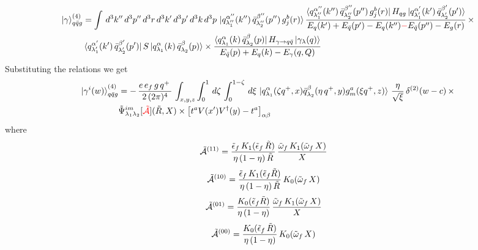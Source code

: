 \documentclass[9pt]{article}
\newcommand{\chg}[1]{{\color{red}#1}}
\numberwithin{equation}{section}
\begin{document}
\begin{enumerate}
\begin{align}
\end{align}
\begin{align}
    \ket{\gamma}^{(4)}_{q\Bar{q}g} & =  \int\, d^{3}k''\, d^{3}p''\, d^{3}r\, d^{3}k'\, d^{3}p'\, d^{3}k\, d^{3}p\,\ket{q^{\alpha''}_{\lambda''_{1}}(k'')\,\Bar{q}^{\beta''}_{\lambda''_{2}}(p'')\,g^{b}_{j}(r)}\frac{\bra{q^{\alpha''}_{\lambda''_{1}}(k'')\,\Bar{q}^{\beta''}_{\lambda''_{2}}(p'')\,g^{b}_{j}(r)}H_{qg}\ket{q^{\alpha'}_{\lambda'_{1}}(k')\,\Bar{q}^{\beta'}_{\lambda'_{2}}(p')}}{E_{q}(k')+E_{\Bar{q}}(p')-E_{q}(k'')\chg{-}E_{\Bar{q}}(p'')-E_{g}(r)}\,\times \notag \\ & \bra{q^{\alpha'}_{\lambda'_{1}}(k')\,\Bar{q}^{\beta'}_{\lambda'_{2}}(p')}S\ket{q^{\alpha}_{\lambda_{1}}(k)\,\Bar{q}^{\beta}_{\lambda_{2}}(p)}\times  \frac{\bra{q^{\alpha}_{\lambda_{1}}(k)\,\Bar{q}^{\beta}_{\lambda_{2}}(p)}H_{\gamma\rightarrow q\Bar{q}}\ket{\gamma_{\lambda}(q)}}{E_{\Bar{q}}(p)+E_{q}(k)-E_{\gamma}(q,Q)}
\label{chg:denb}\end{align}
Substituting the relations we get
\begin{align}
    \ket{\gamma^{i}(w)}^{(4)}_{q\Bar{q}g} & = -\,\frac{e\,e_{f}\,g\,q^{+}\,}{2\,(2\pi)^{4}}\, \int_{x,y,z} \int_{0}^{1}\, d\zeta\, \int_{0}^{1-\zeta}\, d\xi\,\ket{q^{\alpha}_{\lambda_{1}}(\zeta q^{+},x)\Bar{q}^{\beta}_{\lambda_{2}}(\eta\,q^{+},y)g^{a}_{m}(\xi q^{+},z)}\, \frac{\eta}{\sqrt{\xi}}\, \delta^{(2)}(w-c)\,\times \notag \\ & \Tilde{\Psi}^{im}_{\lambda_{1}\lambda_{2}}[\chg{\mathcal{\Tilde{A}}}](\Tilde{R},X)\times \left[t^{a}V(x')V^{\dagger}(y)-t^a\right]_{\alpha\beta}
\label{chg:PsiAq}\end{align}
where 
\begin{align}
    \mathcal{\Tilde{A}}^{(11)} & = \frac{\Tilde{\epsilon}_{f}\,K_{1}(\Tilde{\epsilon}_{f}\,\Tilde{R})}{\eta\,(1-\eta)\,\Tilde{R}}\, \frac{\Tilde{\omega}_{f}\,K_{1}(\Tilde{\omega}_{f}\,X)}{X}
\end{align}
\begin{align}
    \mathcal{\Tilde{A}}^{(10)} & = \frac{\Tilde{\epsilon}_{f}\,K_{1}(\Tilde{\epsilon}_{f}\Tilde{R})}{\eta\,(1-\eta)\,\Tilde{R}}\, K_{0}(\Tilde{\omega}_{f}\,X)
\end{align}
\begin{align}
    \mathcal{\Tilde{A}}^{(01)} & =   \frac{K_{0}(\Tilde{\epsilon}_{f}\Tilde{R})}{\eta\,(1-\eta)}\,\frac{\Tilde{\omega}_{f}\,K_{1}(\Tilde{\omega}_{f}\,X)}{X}
\end{align}
\begin{align}
    \mathcal{\Tilde{A}}^{(00)} & = \frac{K_{0}(\Tilde{\epsilon}_{f}\,\Tilde{R})}{\eta\,(1-\eta)}\, K_{0}(\Tilde{\omega}_{f}\,X)

\end{align}
\end{enumerate}
\end{document}
